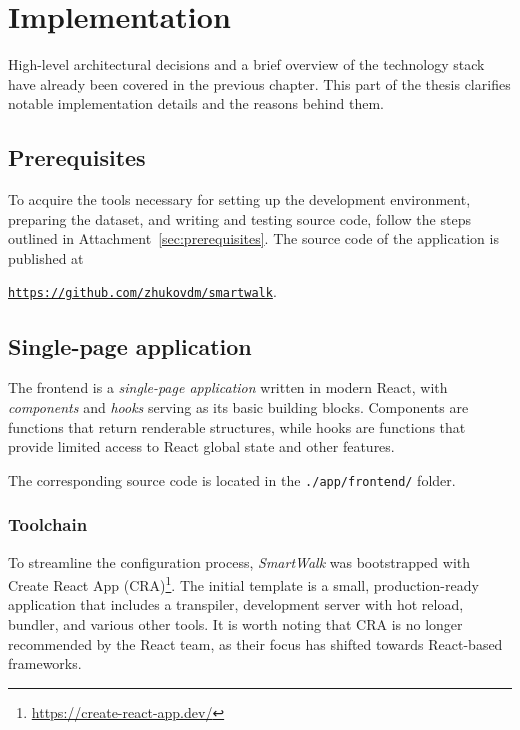 \chapter{Implementation}\label{chap:implementation}

High-level architectural decisions and a brief overview of the technology stack have already been covered in the previous chapter. This part of the thesis clarifies notable implementation details and the reasons behind them.

\section{Prerequisites}

To acquire the tools necessary for setting up the development environment, preparing the dataset, and writing and testing source code, follow the steps outlined in Attachment~\ref{sec:prerequisites}. The source code of the application is published at

\begin{center}
\texttt{\href{https://github.com/zhukovdm/smartwalk}{https://github.com/zhukovdm/smartwalk}}.
\end{center}

\section{Single-page application}

The frontend is a \emph{single-page application} written in modern React, with \emph{components} and \emph{hooks} serving as its basic building blocks. Components are functions that return renderable structures, while hooks are functions that provide limited access to React global state and other features.

The corresponding source code is located in the \texttt{./app/frontend/} folder.

\subsection{Toolchain}

To streamline the configuration process, \emph{SmartWalk} was bootstrapped with Create React App (CRA)\footnote{\href{https://create-react-app.dev/}{https://create-react-app.dev/}}. The initial template is a small, production-ready application that includes a transpiler, development server with hot reload, bundler, and various other tools. It is worth noting that CRA is no longer recommended by the React team, as their focus has shifted towards React-based frameworks.

